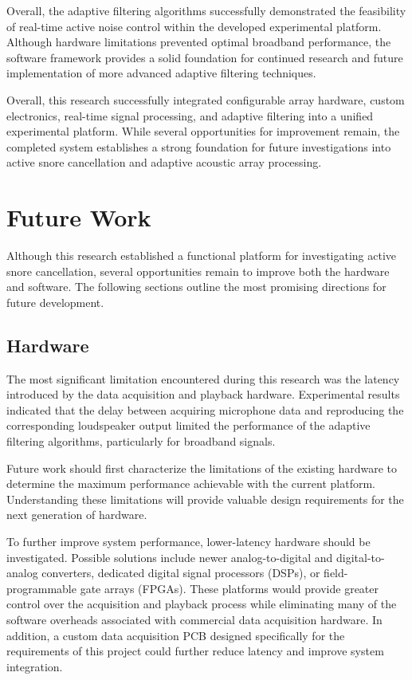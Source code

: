 Overall, the adaptive filtering algorithms successfully demonstrated the feasibility of real-time active noise control within the developed experimental platform. Although hardware limitations prevented optimal broadband performance, the software framework provides a solid foundation for continued research and future implementation of more advanced adaptive filtering techniques.

Overall, this research successfully integrated configurable array hardware, custom electronics, real-time signal processing, and adaptive filtering into a unified experimental platform. While several opportunities for improvement remain, the completed system establishes a strong foundation for future investigations into active snore cancellation and adaptive acoustic array processing.

\section{Future Work}

Although this research established a functional platform for investigating active snore cancellation, several opportunities remain to improve both the hardware and software. The following sections outline the most promising directions for future development.

\subsection{Hardware}

The most significant limitation encountered during this research was the latency introduced by the data acquisition and playback hardware. Experimental results indicated that the delay between acquiring microphone data and reproducing the corresponding loudspeaker output limited the performance of the adaptive filtering algorithms, particularly for broadband signals.

Future work should first characterize the limitations of the existing hardware to determine the maximum performance achievable with the current platform. Understanding these limitations will provide valuable design requirements for the next generation of hardware.

To further improve system performance, lower-latency hardware should be investigated. Possible solutions include newer analog-to-digital and digital-to-analog converters, dedicated digital signal processors (DSPs), or field-programmable gate arrays (FPGAs). These platforms would provide greater control over the acquisition and playback process while eliminating many of the software overheads associated with commercial data acquisition hardware. In addition, a custom data acquisition PCB designed specifically for the requirements of this project could further reduce latency and improve system integration.

